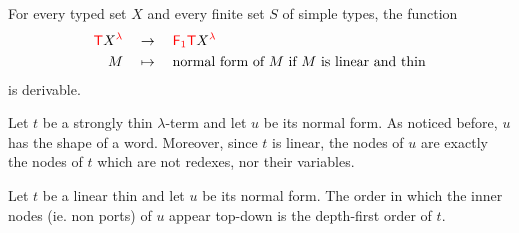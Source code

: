 \begin{proposition}\label{prop:EvaluateThin}
 For every typed set $X$ and every finite set $S$ of simple types, the function 
    \begin{align*}
    {\color{red}{\mathsf T}} {X}^{{\color{red}{\lambda}}} &\quad\to\quad {\color{red}{\mathsf F_{1}}}{\color{red}{\mathsf T}} {X}^{{\color{red}{\lambda}}}\\
        M & \quad \mapsto \quad \text{normal form of $M$ if $M$ is linear and thin}
    \end{align*}
    is derivable.
\end{proposition}

Let $t$ be a strongly thin $\lambda$-term and let $u$ be its normal form. As noticed before, $u$ has the shape of a word. Moreover, since $t$ is linear, the nodes of $u$ are exactly the nodes of $t$ which are not redexes, nor their variables.

\begin{proposition}\label{prop:normal-form-depth-first} Let $t$ be a linear thin \lambdaterm and let $u$ be its normal form. 
The order in which the inner nodes (ie. non ports) of $u$ appear top-down is the depth-first order of $t$.  
\end{proposition}

